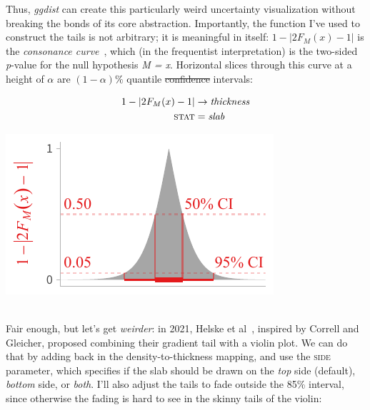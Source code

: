 \documentclass[journal]{vgtc}                     %
\newcommand{\equationfigure}[2]{%
\noindent
\begin{minipage}{.5\columnwidth}
\setlength{\abovedisplayskip}{0pt} %
\setlength{\belowdisplayskip}{0pt} %
#1\end{minipage}%
\begin{minipage}{.4\columnwidth}\centering #2 \end{minipage}%
\vspace{.5\belowdisplayskip}\\
}
\providecommand{\DIFdel}[1]{{\protect\color{red}\sout{#1}}}                      %
\providecommand{\DIFdelbegin}{} %
\providecommand{\DIFdelend}{} %
\begin{document}
Thus, \textit{ggdist} can create this particularly weird uncertainty visualization without breaking the bonds of its core abstraction. Importantly, the function I've used to construct the tails is not arbitrary; it is meaningful in itself: $1 - \lvert 2 F_M(x) - 1 \rvert$ is the \textit{consonance curve}~\cite{amrhein2022discuss}, which (in the frequentist interpretation) is the two-sided \textit{p}-value for the null hypothesis \textit{M = x}. Horizontal slices through this curve at a height of $\alpha$ are $(1 - \alpha)\%$ quantile \DIFdelbegin \DIFdel{confidence }\DIFdelend intervals:


\equationfigure{
\begin{align*}
1 - \lvert 2 F_M(x) - 1 \rvert &\rightarrow \textit{thickness}\\
\textsc{stat} &= \mathit{slab}
\end{align*}
}{\includegraphics[width=1.2\columnwidth]{figs/3-slab_consonance.pdf}}
Fair enough, but let's get \textit{weirder}: in 2021, Helske et al~\cite{helske2021can}, inspired by Correll and Gleicher, proposed combining their gradient tail with a violin plot. We can do that by adding back in the density-to-thickness mapping, and use the \textsc{side} parameter, which specifies if the slab should be drawn on the \textit{top} side (default), \textit{bottom} side, or \textit{both}. I'll also adjust the tails to fade outside the 85\% interval, since otherwise the fading is hard to see in the skinny tails of the violin:
\end{document}
